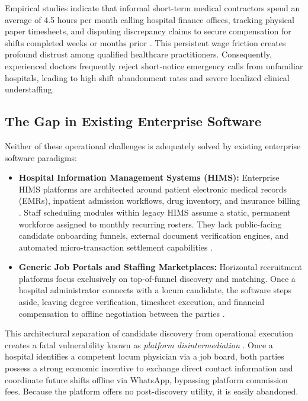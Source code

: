 \documentclass[conference]{IEEEtran}
\begin{document}
Empirical studies indicate that informal short-term medical contractors spend an average of 4.5 hours per month calling hospital finance offices, tracking physical paper timesheets, and disputing discrepancy claims to secure compensation for shifts completed weeks or months prior \cite{verma2023wage}. This persistent wage friction creates profound distrust among qualified healthcare practitioners. Consequently, experienced doctors frequently reject short-notice emergency calls from unfamiliar hospitals, leading to high shift abandonment rates and severe localized clinical understaffing.

\subsection{The Gap in Existing Enterprise Software}
Neither of these operational challenges is adequately solved by existing enterprise software paradigms:
\begin{itemize}
    \item \textbf{Hospital Information Management Systems (HIMS):} Enterprise HIMS platforms are architected around patient electronic medical records (EMRs), inpatient admission workflows, drug inventory, and insurance billing \cite{chen2022evolution}. Staff scheduling modules within legacy HIMS assume a static, permanent workforce assigned to monthly recurring rosters. They lack public-facing candidate onboarding funnels, external document verification engines, and automated micro-transaction settlement capabilities \cite{chen2022evolution}.
    \item \textbf{Generic Job Portals and Staffing Marketplaces:} Horizontal recruitment platforms focus exclusively on top-of-funnel discovery and matching. Once a hospital administrator connects with a locum candidate, the software steps aside, leaving degree verification, timesheet execution, and financial compensation to offline negotiation between the parties \cite{toutanova2023trust}. 
\end{itemize}

This architectural separation of candidate discovery from operational execution creates a fatal vulnerability known as \textit{platform disintermediation} \cite{edelman2016disintermediation}. Once a hospital identifies a competent locum physician via a job board, both parties possess a strong economic incentive to exchange direct contact information and coordinate future shifts offline via WhatsApp, bypassing platform commission fees. Because the platform offers no post-discovery utility, it is easily abandoned.
\end{document}
